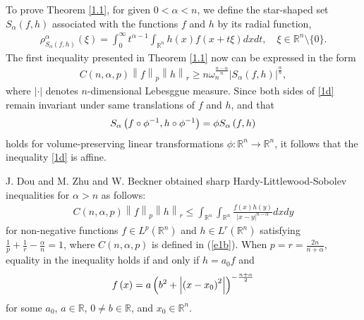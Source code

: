 \documentclass[preprint,12pt]{elsarticle}
\begin{document}
	To prove Theorem \ref{1.1}, for given $0< \alpha < n$, we define the star-shaped set $S_{\alpha }\left ( f,h \right )$ associated with the functions $f$ and $h$ by its radial function,
	\begin{eqnarray}\label{1c}
		\rho^{\alpha } _{S_{\alpha }\left ( f,h \right )  }\left ( \xi  \right )=\int_{0}^{\infty }t^{\alpha -1}\int_{\mathbb{R}^n }h\left ( x \right )f\left ( x+t\xi  \right )dxdt,\quad \xi \in \mathbb{R}^{n}\setminus\{0\}.  
	\end{eqnarray}  
	The first inequality presented in Theorem \ref{1.1} now can be expressed in the form 
	\begin{eqnarray}
		C\left ( n,\alpha ,p \right )\left \| f \right \|_{p}\left \| h \right \|_{r}\ge n\omega^{\frac{n-\alpha }{n} }_{n}\left | S_{\alpha  }\left ( f,h \right )   \right |^{\frac{\alpha }{n} } , \label{1d}
	\end{eqnarray}
	where $\left | \cdot  \right | $ denotes $n$-dimensional Lebesggue measure. Since both sides of \eqref{1d} remain invariant under same translations of $f$ and $h$, and that \begin{eqnarray}
		S_{\alpha }\left ( f\circ \phi ^{-1} ,h\circ \phi ^{-1} \right )=\phi S_{\alpha }\left ( f,h \right )  \notag  
	\end{eqnarray} 
	 holds for volume-preserving linear transformations $\phi :\mathbb{R}^n\to \mathbb{R}^n$, it follows that the inequality \eqref{1d} is affine.
	
	
	J. Dou and M. Zhu \cite{DZ15} and W. Beckner \cite{Beckner15} obtained sharp Hardy-Littlewood-Sobolev inequalities for $\alpha > n$ as follows:
	\begin{eqnarray}\label{e1.6}
		C\left ( n,\alpha ,p \right )\left \| f \right \|_{p}\left \| h \right \|_{r}\le\int_{\mathbb{R}^n}\int_{\mathbb{R}^n}\frac{f\left ( x \right )h\left ( y \right )  }{\left | x-y \right |^{n-\alpha }  }dxdy
	\end{eqnarray}
	for non-negative functions $f\in L^{p}\left ( \mathbb{R}^n  \right )$ and $h\in L^{r}\left ( \mathbb{R}^n  \right )$ satisfying $\frac{1}{p}+\frac{1}{r}-\frac{\alpha }{n}=1$, where $C\left ( n,\alpha ,p \right )$ is defined in (\ref{e1b}). 
	When $p=r=\frac{2n}{n+\alpha }$, equality in the inequality holds if and only if $h= a_{0} f$ and
	\begin{eqnarray}
		f\left ( x \right )=a\left ( b ^{2}+\left | \left ( x-x_{0} \right )^{2}    \right |   \right )^{-\frac{n+\alpha }{2} }\notag
	\end{eqnarray}
	for some $a_{0}$, $a\in \mathbb{R}$, $0\ne b \in \mathbb{R}$, and $x_{0}\in \mathbb{R }^{n}$.
	
\end{document}
